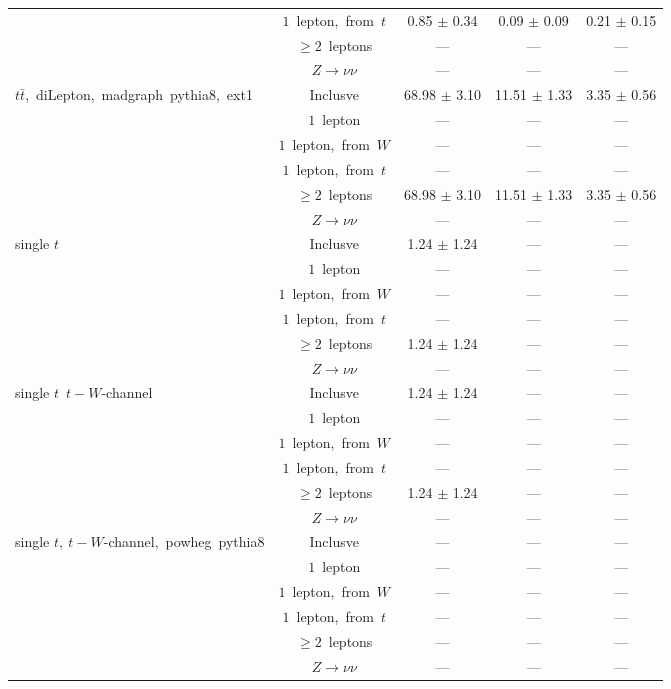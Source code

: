 \documentclass{article}
\begin{document}
\begin{longtable}{|l|c|c|c|c|}
 & $1$~lepton,~from~$t$  & 0.85 $\pm$ 0.34  & 0.09 $\pm$ 0.09  & 0.21 $\pm$ 0.15 \\* 
 & $\ge2$~leptons  & ---  & ---  & --- \\* 
 & $Z\rightarrow\nu\nu$  & ---  & ---  & --- \\* 
\hline 
\multirow{6}{*}{$t\bar{t}$,~diLepton,~madgraph~pythia8,~ext1} & Inclusve  & 68.98 $\pm$ 3.10  & 11.51 $\pm$ 1.33  & 3.35 $\pm$ 0.56 \\* 
 & $1$~lepton  & ---  & ---  & --- \\* 
 & $1$~lepton,~from~$W$  & ---  & ---  & --- \\* 
 & $1$~lepton,~from~$t$  & ---  & ---  & --- \\* 
 & $\ge2$~leptons  & 68.98 $\pm$ 3.10  & 11.51 $\pm$ 1.33  & 3.35 $\pm$ 0.56 \\* 
 & $Z\rightarrow\nu\nu$  & ---  & ---  & --- \\* 
\hline 
\multirow{6}{*}{single $t$} & Inclusve  & 1.24 $\pm$ 1.24  & ---  & --- \\* 
 & $1$~lepton  & ---  & ---  & --- \\* 
 & $1$~lepton,~from~$W$  & ---  & ---  & --- \\* 
 & $1$~lepton,~from~$t$  & ---  & ---  & --- \\* 
 & $\ge2$~leptons  & 1.24 $\pm$ 1.24  & ---  & --- \\* 
 & $Z\rightarrow\nu\nu$  & ---  & ---  & --- \\* 
\hline 
\multirow{6}{*}{single $t$~$t-W$-channel} & Inclusve  & 1.24 $\pm$ 1.24  & ---  & --- \\* 
 & $1$~lepton  & ---  & ---  & --- \\* 
 & $1$~lepton,~from~$W$  & ---  & ---  & --- \\* 
 & $1$~lepton,~from~$t$  & ---  & ---  & --- \\* 
 & $\ge2$~leptons  & 1.24 $\pm$ 1.24  & ---  & --- \\* 
 & $Z\rightarrow\nu\nu$  & ---  & ---  & --- \\* 
\hline 
\multirow{6}{*}{single $t,~t-W$-channel,~powheg~pythia8} & Inclusve  & ---  & ---  & --- \\* 
 & $1$~lepton  & ---  & ---  & --- \\* 
 & $1$~lepton,~from~$W$  & ---  & ---  & --- \\* 
 & $1$~lepton,~from~$t$  & ---  & ---  & --- \\* 
 & $\ge2$~leptons  & ---  & ---  & --- \\* 
 & $Z\rightarrow\nu\nu$  & ---  & ---  & --- \\* 

\end{longtable}
\end{document}
